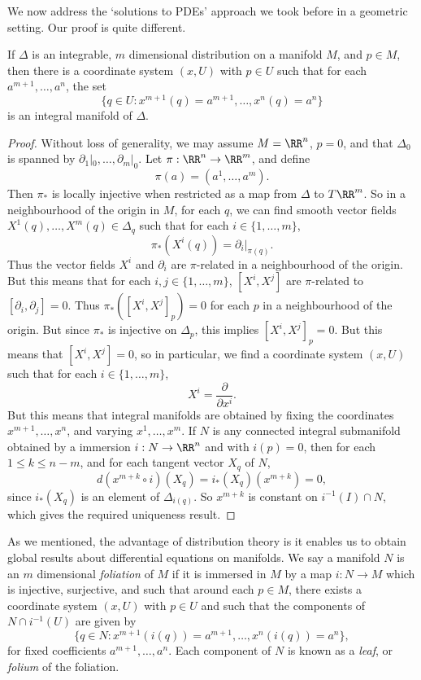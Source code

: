 We now address the `solutions to PDEs' approach we took before in a geometric setting. Our proof is quite different.

\begin{theorem}
    If $\Delta$ is an integrable, $m$ dimensional distribution on a manifold $M$, and $p \in M$, then there is a coordinate system $(x,U)$ with $p \in U$ such that for each $a^{m+1}, \dots, a^n$, the set
    \[ \{ q \in U: x^{m+1}(q) = a^{m+1}, \dots, x^n(q) = a^n \} \]
    is an integral manifold of $\Delta$.
\end{theorem}
\begin{proof}
   Without loss of generality, we may assume $M = \RR^n$, $p = 0$, and that $\Delta_0$ is spanned by $\partial_1|_0, \dots, \partial_m|_0$. Let $\pi: \RR^n \to \RR^m$, and define
   \[ \pi(a) = (a^1, \dots, a^m). \]
   Then $\pi_*$ is locally injective when restricted as a map from $\Delta$ to $T\RR^m$. So in a neighbourhood of the origin in $M$, for each $q$, we can find smooth vector fields $X^1(q), \dots, X^m(q) \in \Delta_q$ such that for each $i \in \{ 1, \dots, m \}$,
   \[ \pi_*(X^i(q)) = \left. \partial_i \right|_{\pi(q)}. \]
   Thus the vector fields $X^i$ and $\partial_i$ are $\pi$-related in a neighbourhood of the origin. But this means that for each $i,j \in \{ 1, \dots, m \}$, $[X^i,X^j]$ are $\pi$-related to $[\partial_i,\partial_j] = 0$. Thus $\pi_*([X^i,X^j]_p) = 0$ for each $p$ in a neighbourhood of the origin. But since $\pi_*$ is injective on $\Delta_p$, this implies $[X^i,X^j]_p = 0$. But this means that $[X^i,X^j] = 0$, so in particular, we find a coordinate system $(x,U)$ such that for each $i \in \{ 1, \dots, m \}$,
   \[ X^i = \frac{\partial}{\partial x^i}. \]
   But this means that integral manifolds are obtained by fixing the coordinates $x^{m+1}, \dots, x^n$, and varying $x^1, \dots, x^m$. If $N$ is any connected integral submanifold obtained by a immersion $i: N \to \RR^n$ and with $i(p) = 0$, then for each $1 \leq k \leq n-m$, and for each tangent vector $X_q$ of $N$,
   \[ d(x^{m+k} \circ i)(X_q) = i_*(X_q)(x^{m+k}) = 0, \]
   since $i_*(X_q)$ is an element of $\Delta_{i(q)}$. So $x^{m+k}$ is constant on $i^{-1}(I) \cap N$, which gives the required uniqueness result.
 \end{proof}

As we mentioned, the advantage of distribution theory is it enables us to obtain global results about differential equations on manifolds. We say a manifold $N$ is an $m$ dimensional \emph{foliation} of $M$ if it is immersed in $M$ by a map $i: N \to M$ which is injective, surjective, and such that around each $p \in M$, there exists a coordinate system $(x,U)$ with $p \in U$ and such that the components of $N \cap i^{-1}(U)$ are given by
%
\[ \{ q \in N: x^{m+1}(i(q)) = a^{m+1}, \dots, x^n(i(q)) = a^n \}, \]
%
for fixed coefficients $a^{m+1}, \dots, a^n$. Each component of $N$ is known as a \emph{leaf}, or \emph{folium} of the foliation.

